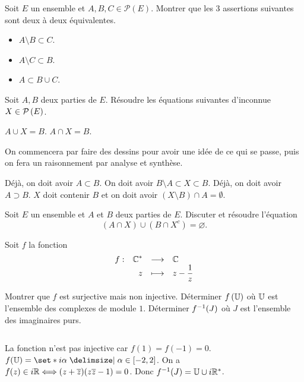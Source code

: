 \documentclass{magnolia}
\begin{document}
Soit $E$ un ensemble et $A,B,C\in\mathcal{P}(E)$. Montrer que les 3 assertions suivantes
sont deux à deux équivalentes.
\begin{itemize}
\item $A\setminus B\subset C$.
\item $A\setminus C\subset B$. 
\item $A\subset B\cup C$.
\end{itemize}


Soit $A,B$ deux parties de $E$. Résoudre les équations suivantes d'inconnue
$X\in\mathcal{P}\left(E\right)$.
\begin{questions}
\question $A\cup X=B$.
\question $A\cap X=B$.
\end{questions}
On commencera par faire des dessins pour avoir une idée de ce qui se passe,
puis on fera un raisonnement par analyse et synthèse.

\begin{sol}

\begin{questions}
\question Déjà, on doit avoir $A\subset B$. On doit avoir $B\setminus A\subset X\subset B$.
\question Déjà, on doit avoir $A\supset B$. $X$ doit contenir $B$ et on doit avoir $(X\setminus B)\cap A=\emptyset$.
\end{questions}

\end{sol}

Soit $E$ un ensemble et $A$ et $B$ deux parties de $E$. Discuter et résoudre
l'équation
\[(A\cap X)\cup(B\cap X^c)=\varnothing.\]


Soit $f$ la fonction
\[\begin{array}[t]{lrcl} \displaystyle{f} : & \displaystyle{\mathbb{C}^*} & \longrightarrow & \displaystyle{\mathbb{C}} \\ & \displaystyle{z} & \longmapsto & \displaystyle{z-\frac{1}{z}} \end{array}\]
\begin{questions}
\question Montrer que $f$ est surjective mais non injective.
\question Déterminer $f\p{\U}$ où $\U$ est l'ensemble des complexes de module
  $1$.
\question Déterminer $f^{-1}(J)$ où $J$ est l'ensemble des imaginaires
  purs.
\end{questions}
\begin{sol}
$\quad$
\begin{questions}
\question La fonction n'est pas injective car $f(1)=f(-1)=0$.
\question $f(\U)=\enstq{i\alpha}{\alpha\in\interf{-2}{2}}$.
\question On a $f(z)\in i\mathbb{R} \Longleftrightarrow (z+\overline{z})(z\overline{z}-1)=0$. Donc
  $f^{-1}(J)=\U\cup i\Rs$.
\end{questions}
\end{sol}
\end{document}
